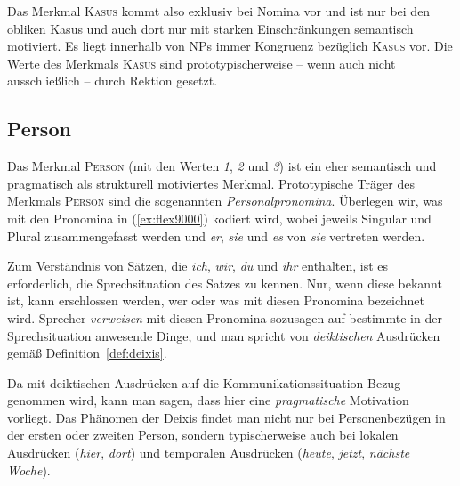 Das Merkmal \textsc{Kasus} kommt also exklusiv bei Nomina vor und ist nur bei den obliken Kasus und auch dort nur mit starken Einschränkungen semantisch motiviert.
Es liegt innerhalb von NPs immer Kongruenz bezüglich \textsc{Kasus} vor.
Die Werte des Merkmals \textsc{Kasus} sind prototypischerweise -- wenn auch nicht ausschließlich -- durch Rektion gesetzt.

\subsection{Person}

\label{sec:person}

Das Merkmal \textsc{Person} (mit den Werten \textit{1}, \textit{2} und \textit{3}) ist ein eher semantisch und pragmatisch als strukturell motiviertes Merkmal.
Prototypische Träger des Merkmals \textsc{Person} sind die sogenannten \textit{Personalpronomina}.
Überlegen wir, was mit den Pronomina in (\ref{ex:flex9000}) kodiert wird, wobei jeweils Singular und Plural zusammengefasst werden und \textit{er}, \textit{sie} und \textit{es} von \textit{sie} vertreten werden.

\begin{exe}
  \ex \label{ex:flex9000}
  \begin{xlist}
  \end{xlist}
\end{exe}


Zum Verständnis von Sätzen, die \textit{ich}, \textit{wir}, \textit{du} und \textit{ihr} enthalten, ist es erforderlich, die Sprechsituation des Satzes zu kennen.
Nur, wenn diese bekannt ist, kann erschlossen werden, wer oder was mit diesen Pronomina bezeichnet wird.
Sprecher \textit{verweisen} mit diesen Pronomina sozusagen auf bestimmte in der Sprechsituation anwesende Dinge, und man spricht von \textit{deiktischen} Ausdrücken gemäß Definition~\ref{def:deixis}.


Da mit deiktischen Ausdrücken auf die Kommunikationssituation Bezug genommen wird, kann man sagen, dass hier eine \textit{pragmatische} Motivation vorliegt.
Das Phänomen der Deixis findet man nicht nur bei Personenbezügen in der ersten oder zweiten Person, sondern typischerweise auch bei lokalen Ausdrücken (\textit{hier}, \textit{dort}) und temporalen Ausdrücken (\textit{heute}, \textit{jetzt}, \textit{nächste Woche}).

